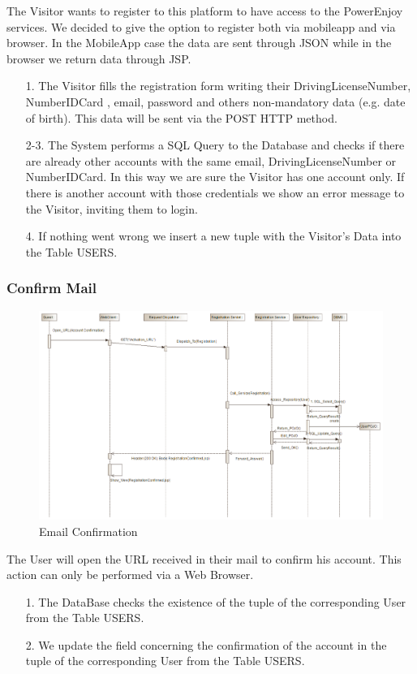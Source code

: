 \documentclass[12pt]{article}
\begin{document}
The Visitor wants to register to this platform to have access to the PowerEnjoy services.
We decided to give the option to register both via mobileapp and via browser. 
In the MobileApp case the data are sent through JSON while in the browser we return data through JSP.
\begin{enumerate}
	\item[1.] The Visitor fills the registration form writing their DrivingLicenseNumber, NumberIDCard , email, password and others non-mandatory data (e.g. date of birth). This data will be sent via the POST HTTP method.
	\item[2-3.] The System performs a SQL Query to the Database and checks if there are already other accounts with the same email, DrivingLicenseNumber or NumberIDCard. In this way we are sure the Visitor has one account only. If there is another account with those credentials we show an error message to the Visitor, inviting them to login.
	\item[4.] If nothing went wrong we insert a new tuple with the Visitor's Data into the Table USERS. 
\end{enumerate}
\clearpage
\subsubsection{Confirm Mail}
\begin{figure}[h]
	\centering
	\includegraphics[width=\textwidth]{../Images/Sequence_Final/Confirm_Email}
	\caption{Email Confirmation}
\end{figure}

The User will open the URL received in their mail to confirm his account. This action can only be performed via a Web Browser.
\begin{enumerate}
	\item[1.] The DataBase checks the existence of the tuple of the corresponding User from the Table USERS.
	\item[2.] We update the field concerning the confirmation of the account in the tuple of the corresponding User from the Table USERS.
\end{enumerate}
\clearpage
\end{document}
